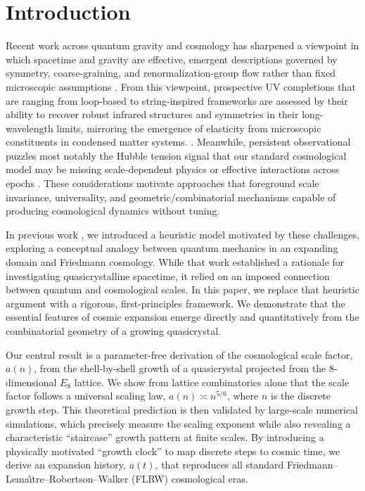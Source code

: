 \documentclass[universe,article,submit,pdftex,moreauthors]{Definitions/mdpi}
\begin{document}
\section{Introduction}

Recent work across quantum gravity and cosmology has sharpened a viewpoint in which spacetime and gravity are effective, emergent descriptions governed by symmetry, coarse-graining, and renormalization-group flow rather than fixed microscopic assumptions \cite{Verlinde2011}. From this viewpoint, prospective UV completions that are ranging from loop-based to string-inspired frameworks are assessed by their ability to recover robust infrared structures and symmetries in their long-wavelength limits, mirroring the emergence of elasticity from microscopic constituents in condensed matter systems. \cite{Rovelli-Vidotto-Book,stringbook1,Tahim2009}. Meanwhile, persistent observational puzzles most notably the Hubble tension signal that our standard cosmological model may be missing scale-dependent physics or effective interactions across epochs \cite{hubbletension,hubble,lawsofnature,Kuzmichev}. These considerations motivate approaches that foreground scale invariance, universality, and geometric/combinatorial mechanisms capable of producing cosmological dynamics without tuning.

In previous work \cite{Amaral2024}, we introduced a heuristic model motivated by these challenges, exploring a conceptual analogy between quantum mechanics in an expanding domain and Friedmann cosmology. While that work established a rationale for investigating quasicrystalline spacetime, it relied on an imposed connection between quantum and cosmological scales. In this paper, we replace that heuristic argument with a rigorous, first-principles framework. We demonstrate that the essential features of cosmic expansion emerge directly and quantitatively from the combinatorial geometry of a growing quasicrystal.

Our central result is a parameter-free derivation of the cosmological scale factor, $a(n)$, from the shell-by-shell growth of a quasicrystal projected from the 8-dimensional $E_8$ lattice. We show from lattice combinatorics alone that the scale factor follows a universal scaling law, $a(n) \asymp n^{5/6}$, where $n$ is the discrete growth step. This theoretical prediction is then validated by large-scale numerical simulations, which precisely measure the scaling exponent while also revealing a characteristic ``staircase'' growth pattern at finite scales. By introducing a physically motivated ``growth clock'' to map discrete steps to cosmic time, we derive an expansion history, $a(t)$, that reproduces all standard Friedmann--Lema\^{\i}tre--Robertson--Walker (FLRW) cosmological eras.
\end{document}
